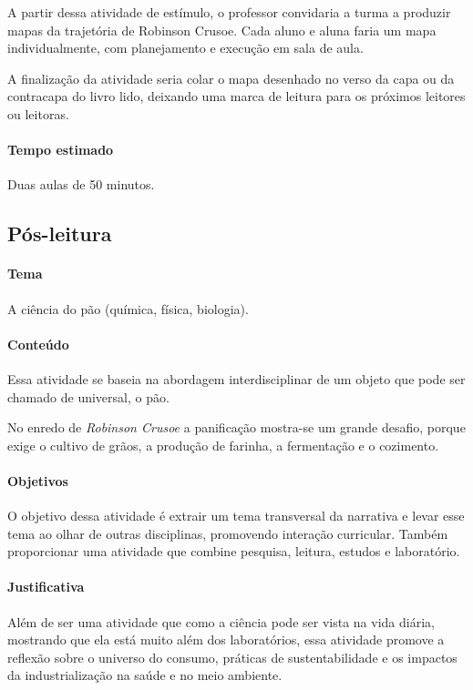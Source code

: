 \documentclass[12pt]{extarticle}
\begin{document}
A partir dessa atividade de estímulo, o professor convidaria a turma a
produzir mapas da trajetória de Robinson Crusoe. Cada aluno e aluna
faria um mapa individualmente, com planejamento e execução em sala de
aula.

A finalização da atividade seria colar o mapa desenhado no verso da capa
ou da contracapa do livro lido, deixando uma marca de leitura para os
próximos leitores ou leitoras.

\paragraph{Tempo estimado} Duas aulas de 50 minutos.

\subsection{Pós-leitura}

\paragraph{Tema} A ciência do pão (química, física, biologia).


\paragraph{Conteúdo}
Essa atividade se baseia na abordagem interdisciplinar de um objeto que
pode ser chamado de universal, o pão.

No enredo de \emph{Robinson Crusoe} a panificação mostra-se um grande
desafio, porque exige o cultivo de grãos, a produção de farinha, a
fermentação e o cozimento.

\paragraph{Objetivos}
O objetivo dessa atividade é extrair um tema transversal da narrativa e
levar esse tema ao olhar de outras disciplinas, promovendo interação
curricular. Também proporcionar uma atividade que combine pesquisa,
leitura, estudos e laboratório.

\paragraph{Justificativa}

Além de ser uma atividade que como a ciência pode ser vista na vida
diária, mostrando que ela está muito além dos laboratórios, essa
atividade promove a reflexão sobre o universo do consumo, práticas de
sustentabilidade e os impactos da industrialização na saúde e no meio
ambiente.
\end{document}
